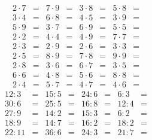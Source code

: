 \documentclass[14pt, a4paper]{extarticle}
\begin{document}
\begin{align*}
2\cdot7&= & 7\cdot9&= & 3\cdot8&= & 5\cdot8&=\\
3\cdot4&= & 6\cdot8&= & 4\cdot5&= & 3\cdot9&=\\
5\cdot9&= & 3\cdot7&= & 6\cdot9&= & 5\cdot5&=\\
2\cdot2&= & 4\cdot4&= & 4\cdot9&= & 7\cdot7&=\\
2\cdot3&= & 2\cdot9&= & 2\cdot6&= & 3\cdot3&=\\
2\cdot5&= & 8\cdot9&= & 7\cdot8&= & 9\cdot9&=\\
2\cdot8&= & 3\cdot6&= & 6\cdot7&= & 3\cdot5&=\\
6\cdot6&= & 4\cdot8&= & 5\cdot6&= & 8\cdot8&=\\
2\cdot4&= & 5\cdot7&= & 4\cdot7&= & 4\cdot6&=
\end{align*}
\begin{align*}
    12:3 &=& 15:5 &=& 24:6 &=& 6:3 &=\\
    30:6 &=& 25:5 &=& 16:8 &=& 12:4 &=\\
    27:9 &=& 14:2 &=& 15:3 &=& 6:2 &=\\
    18:9 &=& 14:7 &=& 16:2 &=& 18:2 &=\\
    22:11 &=& 36:6 &=& 24:3 &=& 21:7 &=
\end{align*}
\end{document}

